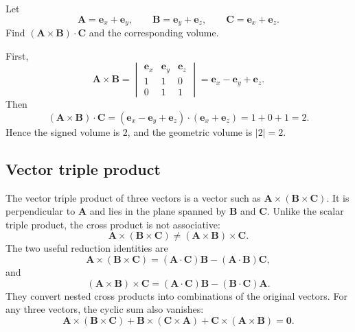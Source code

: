 \begin{example}
Let
\begin{equation}
\mathbf{A}=\mathbf{e}_x+\mathbf{e}_y,
\qquad
\mathbf{B}=\mathbf{e}_y+\mathbf{e}_z,
\qquad
\mathbf{C}=\mathbf{e}_x+\mathbf{e}_z.
\end{equation}
Find $(\mathbf{A}\times\mathbf{B})\cdot\mathbf{C}$ and the corresponding volume.

First,
\begin{equation}
\mathbf{A}\times\mathbf{B}=
\begin{vmatrix}
\mathbf{e}_x & \mathbf{e}_y & \mathbf{e}_z \\
1 & 1 & 0 \\
0 & 1 & 1
\end{vmatrix}
=\mathbf{e}_x-\mathbf{e}_y+\mathbf{e}_z.
\end{equation}
Then
\begin{equation}
(\mathbf{A}\times\mathbf{B})\cdot\mathbf{C}
=(\mathbf{e}_x-\mathbf{e}_y+\mathbf{e}_z)\cdot(\mathbf{e}_x+\mathbf{e}_z)
=1+0+1=2.
\end{equation}
Hence the signed volume is $2$, and the geometric volume is $|2|=2$.
\end{example}

\subsection{Vector triple product}
The vector triple product of three vectors is a vector such as
$\mathbf{A}\times(\mathbf{B}\times\mathbf{C})$. It is perpendicular to
$\mathbf{A}$ and lies in the plane spanned by $\mathbf{B}$ and $\mathbf{C}$.
Unlike the scalar triple product, the cross product is not associative:
\begin{equation}
\mathbf{A}\times(\mathbf{B}\times\mathbf{C})
\ne(\mathbf{A}\times\mathbf{B})\times\mathbf{C}.
\end{equation}
The two useful reduction identities are
\begin{equation}
\mathbf{A}\times(\mathbf{B}\times\mathbf{C})
=(\mathbf{A}\cdot\mathbf{C})\mathbf{B}
-(\mathbf{A}\cdot\mathbf{B})\mathbf{C},
\end{equation}
and
\begin{equation}
(\mathbf{A}\times\mathbf{B})\times\mathbf{C}
=(\mathbf{A}\cdot\mathbf{C})\mathbf{B}
-(\mathbf{B}\cdot\mathbf{C})\mathbf{A}.
\end{equation}
They convert nested cross products into combinations of the original vectors.
For any three vectors, the cyclic sum also vanishes:
\begin{equation}
\mathbf{A}\times(\mathbf{B}\times\mathbf{C})
+\mathbf{B}\times(\mathbf{C}\times\mathbf{A})
+\mathbf{C}\times(\mathbf{A}\times\mathbf{B})=\mathbf{0}.
\end{equation}

